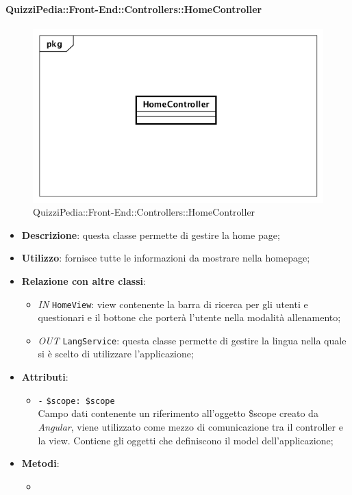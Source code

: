 \begin{itemize}
\begin{itemize}
	\end{itemize}
\end{itemize}

\paragraph{QuizziPedia::Front-End::Controllers::HomeController}
\begin{figure} [ht]
	\centering
	\includegraphics[scale=0.45]{UML/Classi/Front-End/QuizziPedia_Front-end_Controller_HomeController.png}
	\caption{QuizziPedia::Front-End::Controllers::HomeController}
\end{figure} \FloatBarrier
\begin{itemize}
	\item \textbf{Descrizione}: questa classe permette di gestire la home page;
	\item \textbf{Utilizzo}: fornisce tutte le informazioni da mostrare nella homepage;
	\item \textbf{Relazione con altre classi}:
	\begin{itemize}
		\item \textit{IN} \texttt{HomeView}: view contenente la barra di ricerca per gli utenti e questionari e il bottone che porterà l'utente nella modalità allenamento;
		\item \textit{OUT} \texttt{LangService}: questa classe permette di gestire la lingua nella quale si è scelto di utilizzare l'applicazione;
	\end{itemize}
	\item \textbf{Attributi}:
	\begin{itemize}
		\item \texttt{-} \texttt{\$scope: \$scope} \\
		Campo dati contenente un riferimento all’oggetto \$scope creato da \textit{Angular}, viene utilizzato come mezzo di comunicazione tra il controller e la view. Contiene gli oggetti che definiscono il model dell’applicazione;
	\end{itemize}
	\item \textbf{Metodi}:
	\begin{itemize}
		\item 
	\end{itemize}
\end{itemize}

